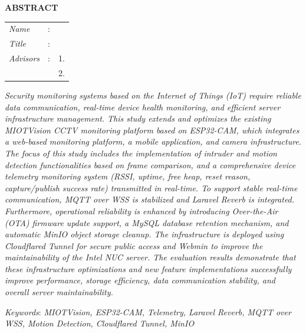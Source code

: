 \begin{center}
	\large\textbf{ABSTRACT}
\end{center}


\vspace{2ex}

\begingroup
\setlength{\tabcolsep}{0pt}

\noindent
\begin{tabularx}{\textwidth}{l >{\centering}m{3em} X}
	\emph{Name}     & : & \name{}         \\
	
	\emph{Title}    & : & \engtatitle{}   \\
	
	\emph{Advisors} & : & 1. \advisor{}   \\
	&   & 2. \coadvisor{} \\
\end{tabularx}
\endgroup

\emph{
	Security monitoring systems based on the Internet of Things (IoT) require reliable data communication, real-time device health monitoring, and efficient server infrastructure management. This study extends and optimizes the existing MIOTVision CCTV monitoring platform based on ESP32-CAM, which integrates a web-based monitoring platform, a mobile application, and camera infrastructure. The focus of this study includes the implementation of intruder and motion detection functionalities based on frame comparison, and a comprehensive device telemetry monitoring system (RSSI, uptime, free heap, reset reason, capture/publish success rate) transmitted in real-time. To support stable real-time communication, MQTT over WSS is stabilized and Laravel Reverb is integrated. Furthermore, operational reliability is enhanced by introducing Over-the-Air (OTA) firmware update support, a MySQL database retention mechanism, and automatic MinIO object storage cleanup. The infrastructure is deployed using Cloudflared Tunnel for secure public access and Webmin to improve the maintainability of the Intel NUC server. The evaluation results demonstrate that these infrastructure optimizations and new feature implementations successfully improve performance, storage efficiency, data communication stability, and overall server maintainability.}

\emph{Keywords}: \emph{MIOTVision, ESP32-CAM, Telemetry, Laravel Reverb, MQTT over WSS, Motion Detection, Cloudflared Tunnel, MinIO}
